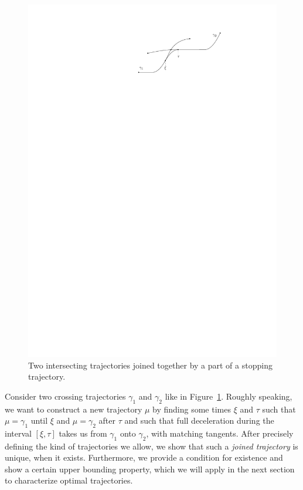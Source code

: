 \documentclass[a4paper]{article}
\theoremstyle{definition}
\theoremstyle{plain}
\begin{document}
\begin{figure}
  \centering
  \includegraphics[scale=1]{figures/motion/rough/curvejoining}
  \caption{Two intersecting trajectories joined together by a part of a stopping
    trajectory.}%
  \label{fig:curvejoining}
\end{figure}

Consider two crossing trajectories $\gamma_{1}$ and $\gamma_{2}$ like in
Figure~\ref{fig:curvejoining}. Roughly speaking, we want to construct a new
trajectory $\mu$ by finding some times $\xi$ and $\tau$ such that
$\mu = \gamma_{1}$ until $\xi$ and $\mu = \gamma_{2}$ after $\tau$ and such that
full deceleration during the interval $[\xi, \tau]$ takes us from $\gamma_{1}$
onto $\gamma_{2}$, with matching tangents.
%
After precisely defining the kind of trajectories we allow, we show that such a
\emph{joined trajectory} is unique, when it exists. Furthermore, we provide a
condition for existence and show a certain upper bounding property, which we
will apply in the next section to characterize optimal trajectories.
\end{document}
